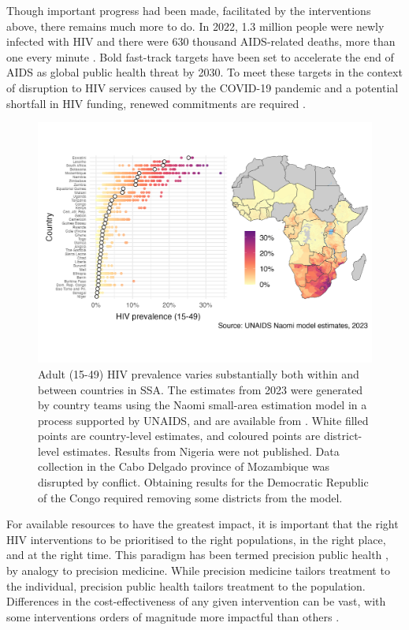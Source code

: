 \documentclass[a4paper, nobind]{templates/ociamthesis}
\begin{document}
Though important progress had been made, facilitated by the interventions above, there remains much more to do.
In 2022, 1.3 million people were newly infected with HIV and there were 630 thousand AIDS-related deaths, more than one every minute \autocite{unaids2022global}.
Bold fast-track targets have been set to accelerate the end of AIDS as global public health threat by 2030.
To meet these targets in the context of disruption to HIV services caused by the COVID-19 pandemic and a potential shortfall in HIV funding, renewed commitments are required \autocite{economist2023triple}.



\begin{figure}
\includegraphics[width=0.95\linewidth]{figures/hiv-aids/naomi-continent} \caption{Adult (15-49) HIV prevalence varies substantially both within and between countries in SSA. The estimates from 2023 were generated by country teams using the Naomi small-area estimation model in a process supported by UNAIDS, and are available from \textcite{unaids2023aidsinfo}. White filled points are country-level estimates, and coloured points are district-level estimates. Results from Nigeria were not published. Data collection in the Cabo Delgado province of Mozambique was disrupted by conflict. Obtaining results for the Democratic Republic of the Congo required removing some districts from the model.}\label{fig:naomi-continent}
\end{figure}

For available resources to have the greatest impact, it is important that the right HIV interventions to be prioritised to the right populations, in the right place, and at the right time.
This paradigm has been termed precision public health \autocite{khoury2016precision}, by analogy to precision medicine.
While precision medicine tailors treatment to the individual, precision public health tailors treatment to the population.
Differences in the cost-effectiveness of any given intervention can be vast, with some interventions orders of magnitude more impactful than others \autocite{ord2013moral}.
\end{document}
